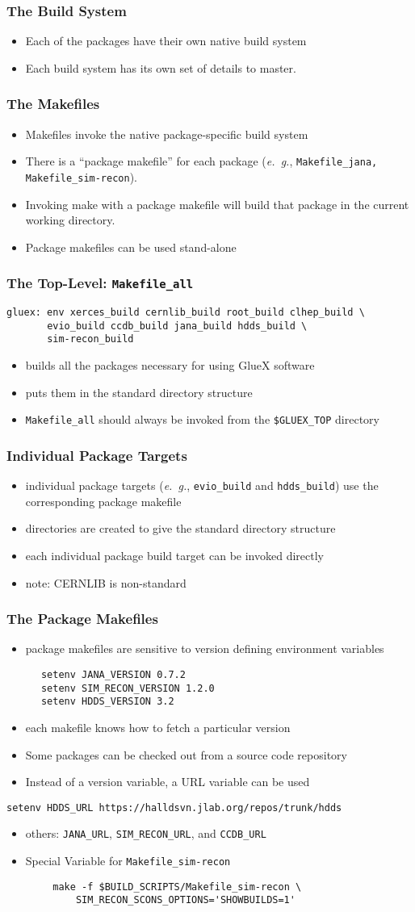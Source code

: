 \documentclass{beamer}
\newcommand{\bi}{\begin{itemize}}
\newcommand{\ei}{\end{itemize}}
\newcommand{\I}{\item}
\begin{document}
\begin{frame}\frametitle{The Build System}
\bi
\I Each of the packages have their own native build system
\I Each build system has its own set of details to master.
\ei
\end{frame}\begin{frame}\frametitle{The Makefiles}
\bi
\I Makefiles invoke the native package-specific build system
\I There is a ``package makefile'' for each package ({\it e.~g.}, {\tt Makefile\_jana, Makefile\_sim-recon}).
\I Invoking make with a package makefile will build that package in the current working directory.
\I Package makefiles can be used stand-alone
\ei
\end{frame}
\begin{frame}[fragile]
  \frametitle{The Top-Level: {\tt Makefile\_all}}

\begin{verbatim}
gluex: env xerces_build cernlib_build root_build clhep_build \
       evio_build ccdb_build jana_build hdds_build \
       sim-recon_build
\end{verbatim}
\bi
\I builds all the packages necessary for using GlueX software
\I puts them in the standard directory structure
\I {{\tt Makefile\_all}} should always be invoked from the {\tt \$GLUEX\_TOP} directory
\ei
\end{frame}
\begin{frame}\frametitle{Individual Package Targets}
\bi
\I individual package targets ({\it e.~g.}, {\tt evio\_build}
and {\tt hdds\_build}) use the corresponding package makefile
\I directories are created to give the standard directory structure
\I each individual package build target can be invoked directly
\I note: CERNLIB is non-standard
\ei
\end{frame}
\begin{frame}[fragile]
  \frametitle{The Package Makefiles}
\bi
\I package makefiles are sensitive to version defining environment variables
\ei
\begin{verbatim}
      setenv JANA_VERSION 0.7.2
      setenv SIM_RECON_VERSION 1.2.0
      setenv HDDS_VERSION 3.2
\end{verbatim}
\bi
\I each makefile knows how to fetch a particular version
\I Some packages can be checked out from a source code repository
\I Instead of a version variable, a URL variable can be used
\ei
\begin{verbatim}
setenv HDDS_URL https://halldsvn.jlab.org/repos/trunk/hdds
\end{verbatim}
\bi
\I others: {\tt JANA\_URL}, {\tt SIM\_RECON\_URL}, and {\tt CCDB\_URL}
\I Special Variable for {\tt Makefile\_sim-recon}
\ei
\begin{verbatim}
        make -f $BUILD_SCRIPTS/Makefile_sim-recon \
            SIM_RECON_SCONS_OPTIONS='SHOWBUILDS=1'
\end{verbatim}
\end{frame}
\end{document}
